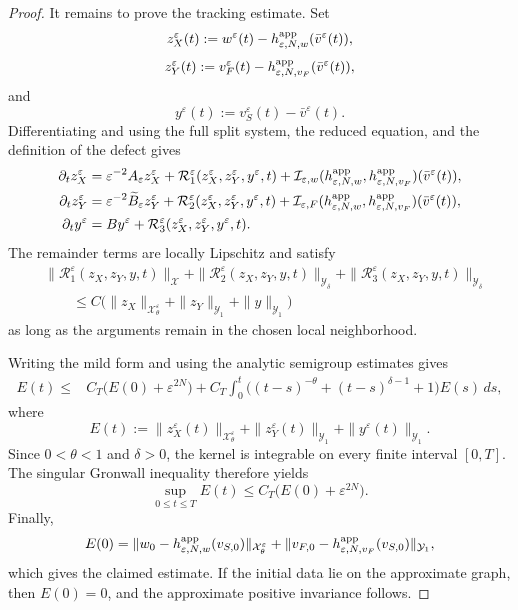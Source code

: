 \documentclass[11pt]{article}
\theoremstyle{definition}
\theoremstyle{remark}
\numberwithin{equation}{section}
\newcommand{\mc}[1]{\mathcal{#1}}
\begin{document}
\begin{proof}
It remains to prove the tracking estimate. Set
\[
z_X^\varepsilon(t)
:=
w^\varepsilon(t)
-
h_{\varepsilon,N,w}^{\rm app}(\bar v^\varepsilon(t)),
\]
\[
z_Y^\varepsilon(t)
:=
v_F^\varepsilon(t)
-
h_{\varepsilon,N,v_F}^{\rm app}(\bar v^\varepsilon(t)),
\]
and
\[
y^\varepsilon(t)
:=
v_S^\varepsilon(t)-\bar v^\varepsilon(t).
\]
Differentiating and using the full split system, the reduced equation, and the
definition of the defect gives
\[
\begin{aligned}
\partial_t z_X^\varepsilon
&=
\varepsilon^{-2}A_\varepsilon z_X^\varepsilon
+
\mathcal R_1^\varepsilon(z_X^\varepsilon,z_Y^\varepsilon,y^\varepsilon,t)
+
\mathcal I_{\varepsilon,w}
(h_{\varepsilon,N,w}^{\rm app},
 h_{\varepsilon,N,v_F}^{\rm app})
(\bar v^\varepsilon(t)),
\\
\partial_t z_Y^\varepsilon
&=
\varepsilon^{-2}\widetilde B_\varepsilon z_Y^\varepsilon
+
\mathcal R_2^\varepsilon(z_X^\varepsilon,z_Y^\varepsilon,y^\varepsilon,t)
+
\mathcal I_{\varepsilon,F}
(h_{\varepsilon,N,w}^{\rm app},
 h_{\varepsilon,N,v_F}^{\rm app})
(\bar v^\varepsilon(t)),
\\
\partial_t y^\varepsilon
&=
By^\varepsilon
+
\mathcal R_3^\varepsilon(z_X^\varepsilon,z_Y^\varepsilon,y^\varepsilon,t).
\end{aligned}
\]
The remainder terms are locally Lipschitz and satisfy
\[
\begin{aligned}
&
\|\mathcal R_1^\varepsilon(z_X,z_Y,y,t)\|_{\mc X}
+
\|\mathcal R_2^\varepsilon(z_X,z_Y,y,t)\|_{\mc Y_\delta}
+
\|\mathcal R_3^\varepsilon(z_X,z_Y,y,t)\|_{\mc Y_\delta}
\\
&\qquad\le
C\Big(
\|z_X\|_{\mc X_\theta^\varepsilon}
+
\|z_Y\|_{\mc Y_1}
+
\|y\|_{\mc Y_1}
\Big)
\end{aligned}
\]
as long as the arguments remain in the chosen local neighborhood.

Writing the mild form and using the analytic semigroup estimates gives
\[
\begin{aligned}
E(t)
\le{}&
C_T
\Big(
E(0)+\varepsilon^{2N}
\Big)
+
C_T
\int_0^t
\Big(
(t-s)^{-\theta}+(t-s)^{\delta-1}+1
\Big)
E(s)\,ds,
\end{aligned}
\]
where
\[
E(t)
:=
\|z_X^\varepsilon(t)\|_{\mc X_\theta^\varepsilon}
+
\|z_Y^\varepsilon(t)\|_{\mc Y_1}
+
\|y^\varepsilon(t)\|_{\mc Y_1}.
\]
Since \(0<\theta<1\) and \(\delta>0\), the kernel is integrable on every finite
interval \([0,T]\). The singular Gronwall inequality therefore yields
\[
\sup_{0\le t\le T}E(t)
\le
C_T
\Big(
E(0)+\varepsilon^{2N}
\Big).
\]
Finally,
\[
E(0)
=
\|w_0-h_{\varepsilon,N,w}^{\rm app}(v_{S,0})\|_{\mc X_\theta^\varepsilon}
+
\|v_{F,0}-h_{\varepsilon,N,v_F}^{\rm app}(v_{S,0})\|_{\mc Y_1},
\]
which gives the claimed estimate. If the initial data lie on the approximate
graph, then \(E(0)=0\), and the approximate positive invariance follows.
\end{proof}
\end{document}
